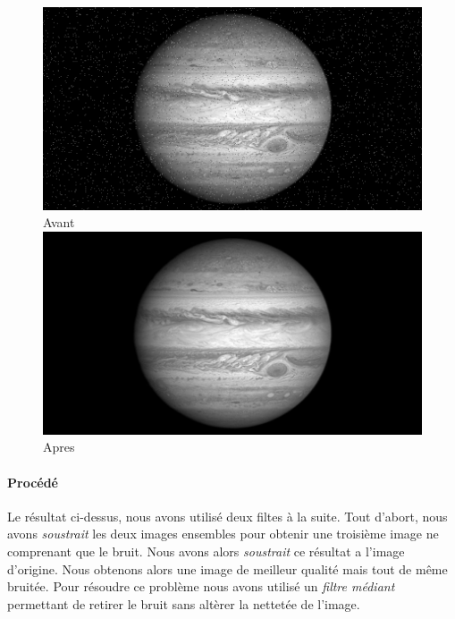 \documentclass{article}
\begin{document}
\begin{figure}[h]
\centering
	\begin{multicols}{2}
	\includegraphics[scale=0.325]{img/Jupiter.png}
	Avant
	\includegraphics[scale=0.325]{img/JupiterAp.png}
	Apres
	\end{multicols}
\end{figure}
\vspace{-0.9cm}

\paragraph{Procédé}

Le résultat ci-dessus, nous avons utilisé deux filtes à la suite. Tout d'abort, nous avons \emph{soustrait} les deux images ensembles pour obtenir une troisième image ne comprenant que le bruit. Nous avons alors \emph{soustrait} ce résultat a l'image d'origine. Nous obtenons alors une image de meilleur qualité mais tout de même bruitée. Pour résoudre ce problème nous avons utilisé un \emph{filtre médiant} permettant de retirer le bruit sans altèrer la nettetée de l'image.
\end{document}

